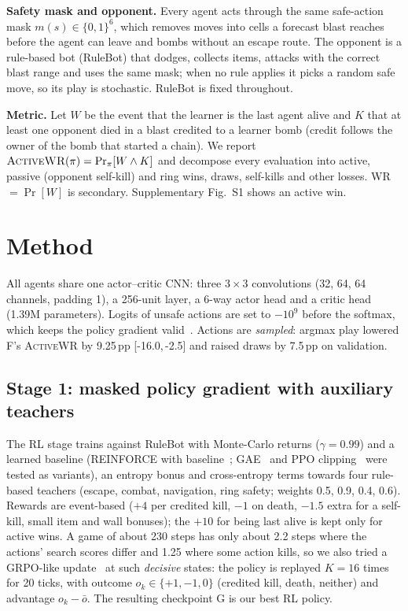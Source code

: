\documentclass[journal]{IEEEtran}
\newcommand{\awr}{\textsc{ActiveWR}}
\newcommand{\pp}{\,pp}
\newcommand{\ci}[2]{[#1,\,#2]}
\begin{document}
\textbf{Safety mask and opponent.} Every agent acts through the same safe-action mask $m(s)\in\{0,1\}^6$, which removes moves into cells a forecast blast reaches before the agent can leave and bombs without an escape route. The opponent is a rule-based bot (RuleBot) that dodges, collects items, attacks with the correct blast range and uses the same mask; when no rule applies it picks a random safe move, so its play is stochastic. RuleBot is fixed throughout.

\textbf{Metric.} Let $W$ be the event that the learner is the last agent alive and $K$ that at least one opponent died in a blast credited to a learner bomb (credit follows the owner of the bomb that started a chain). We report $\awr{}(\pi)=\Pr_{\pi}[W\wedge K]$ and decompose every evaluation into active, passive (opponent self-kill) and ring wins, draws, self-kills and other losses. WR $=\Pr[W]$ is secondary. Supplementary Fig.~S1 shows an active win.

\section{Method}

All agents share one actor--critic CNN: three $3\times3$ convolutions (32, 64, 64 channels, padding 1), a 256-unit layer, a 6-way actor head and a critic head (1.39M parameters). Logits of unsafe actions are set to $-10^9$ before the softmax, which keeps the policy gradient valid~\cite{huang2022masking}. Actions are \emph{sampled}: argmax play lowered F's \awr{} by 9.25\pp{} \ci{-16.0}{-2.5} and raised draws by 7.5\pp{} on validation.

\subsection{Stage 1: masked policy gradient with auxiliary teachers}
The RL stage trains against RuleBot with Monte-Carlo returns ($\gamma=0.99$) and a learned baseline (REINFORCE with baseline~\cite{williams1992reinforce}; GAE~\cite{schulman2016gae} and PPO clipping~\cite{schulman2017ppo} were tested as variants), an entropy bonus and cross-entropy terms towards four rule-based teachers (escape, combat, navigation, ring safety; weights 0.5, 0.9, 0.4, 0.6). Rewards are event-based ($+4$ per credited kill, $-1$ on death, $-1.5$ extra for a self-kill, small item and wall bonuses); the $+10$ for being last alive is kept only for active wins. A game of about 230 steps has only about 2.2 steps where the actions' search scores differ and 1.25 where some action kills, so we also tried a GRPO-like update~\cite{shao2024grpo} at such \emph{decisive} states: the policy is replayed $K=16$ times for 20 ticks, with outcome $o_k\in\{+1,-1,0\}$ (credited kill, death, neither) and advantage $o_k-\bar o$. The resulting checkpoint G is our best RL policy.
\end{document}
